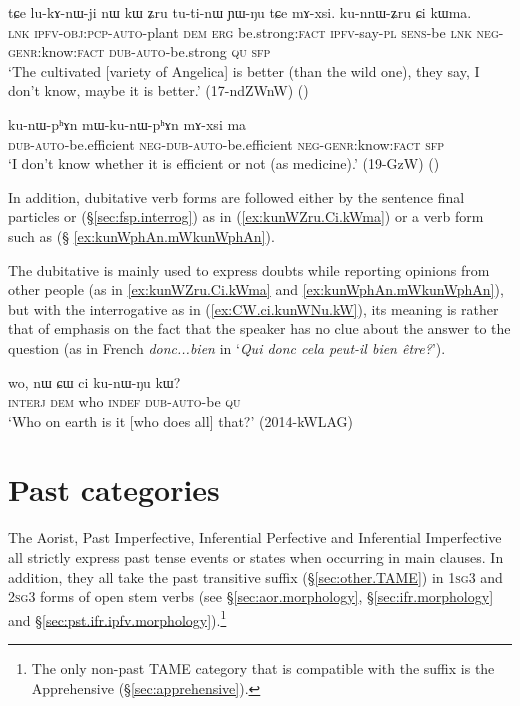  \begin{exe}
\ex \label{ex:kunWZru.Ci.kWma}
 \gll  tɕe lu-kɤ-nɯ-ji nɯ kɯ ʑru tu-ti-nɯ ɲɯ-ŋu tɕe mɤ-xsi. ku-nnɯ-ʑru ɕi kɯma. \\
 \textsc{lnk} \textsc{ipfv}-\textsc{obj}:\textsc{pcp}-\textsc{auto}-plant \textsc{dem} \textsc{erg} be.strong:\textsc{fact} \textsc{ipfv}-say-\textsc{pl} \textsc{sens}-be \textsc{lnk} \textsc{neg}-\textsc{genr}:know:\textsc{fact}  \textsc{dub}-\textsc{auto}-be.strong \textsc{qu} \textsc{sfp} \\
 \glt `The cultivated [variety of Angelica] is better (than the wild one), they say, I don't know, maybe it is better.' (17-ndZWnW)
()
 \end{exe}
 

\begin{exe}
\ex \label{ex:kunWphAn.mWkunWphAn}
 \gll  ku-nɯ-pʰɤn mɯ-ku-nɯ-pʰɤn mɤ-xsi ma \\
 \textsc{dub}-\textsc{auto}-be.efficient \textsc{neg}-\textsc{dub}-\textsc{auto}-be.efficient \textsc{neg}-\textsc{genr}:know:\textsc{fact} \textsc{sfp} \\
\glt `I don't know whether it is efficient or not (as medicine).' (19-GzW) ()
  \end{exe}
 
In addition, dubitative verb forms are followed either by the sentence final particles  or  (§\ref{sec:fsp.interrog}) as in (\ref{ex:kunWZru.Ci.kWma}) or a verb form such as  (§ \ref{ex:kunWphAn.mWkunWphAn}).

The dubitative is mainly used to express doubts while reporting opinions from other people (as in \ref{ex:kunWZru.Ci.kWma} and \ref{ex:kunWphAn.mWkunWphAn}), but with the interrogative  as in (\ref{ex:CW.ci.kunWNu.kW}), its meaning is rather that of emphasis on the fact that the speaker has no clue about the answer to the question (as in French \textit{donc...bien} in `\textit{Qui donc cela peut-il bien être?}').

\begin{exe}
\ex \label{ex:CW.ci.kunWNu.kW}
 \gll wo, nɯ ɕɯ ci ku-nɯ-ŋu kɯ?  \\
 \textsc{interj} \textsc{dem} who \textsc{indef} \textsc{dub}-\textsc{auto}-be \textsc{qu} \\
\glt `Who on earth is it [who does all] that?' (2014-kWLAG)
 \end{exe}
 
\section{Past categories}   \label{sec:TAME.pst}
The Aorist, Past Imperfective, Inferential Perfective and Inferential Imperfective all strictly express past tense events or states when occurring in main clauses. In addition, they all take the past transitive  suffix (§\ref{sec:other.TAME}) in \textsc{1sg}\fl{}3 and \textsc{2sg}\fl{}3 forms of open stem verbs (see §\ref{sec:aor.morphology}, §\ref{sec:ifr.morphology} and §\ref{sec:pst.ifr.ipfv.morphology}).\footnote{The only non-past TAME category that is compatible with the  suffix is the Apprehensive (§\ref{sec:apprehensive}). }

